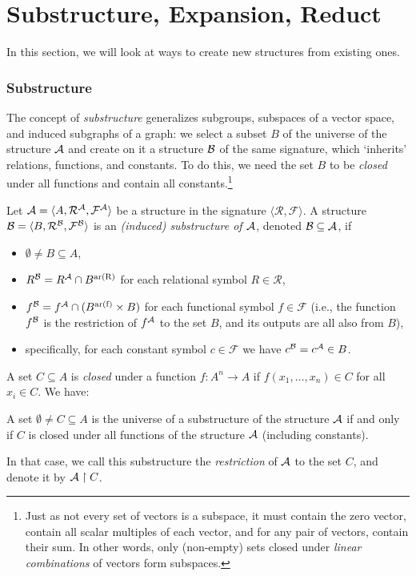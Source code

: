 \section{Substructure, Expansion, Reduct}

In this section, we will look at ways to create new structures from existing ones.

\subsubsection{Substructure}

The concept of \emph{substructure} generalizes subgroups, subspaces of a vector space, and induced subgraphs of a graph: we select a subset $B$ of the universe of the structure $\mathcal{A}$ and create on it a structure $\mathcal{B}$ of the same signature, which `inherits' relations, functions, and constants. To do this, we need the set $B$ to be \emph{closed} under all functions and contain all constants.\footnote{Just as not every set of vectors is a subspace, it must contain the zero vector, contain all scalar multiples of each vector, and for any pair of vectors, contain their sum. In other words, only (non-empty) sets closed under \emph{linear combinations} of vectors form subspaces.}

\begin{definition}[Substructure]
Let $\mathcal{A}=\langle A,\mathcal R^\mathcal A,\mathcal F^\mathcal A\rangle$ be a structure in the signature $\langle\mathcal R,\mathcal F\rangle$. A structure $\mathcal{B}=\langle B,\mathcal R^\mathcal B,\mathcal F^\mathcal B\rangle$ is an \emph{(induced) substructure of $\mathcal{A}$}, denoted $\mathcal{B}\subseteq\mathcal{A}$, if
\begin{itemize}
    \item $\emptyset\neq B\subseteq A$,
    \item $R^{\mathcal{B}}=R^{\mathcal{A}}\cap B^{\mathrm{ar(R)}}$ for each relational symbol $R\in \mathcal R$,
    \item $f^{\mathcal{B}}=f^{\mathcal{A}}\cap (B^{\mathrm{ar(f)}}\times B)$ for each functional symbol $f\in \mathcal F$ (i.e., the function $f^{\mathcal{B}}$ is the restriction of $f^{\mathcal{A}}$ to the set $B$, and its outputs are all also from $B$),
    \item specifically, for each constant symbol $c\in\mathcal F$ we have $c^{\mathcal{B}}=c^{\mathcal{A}}\in B$.
\end{itemize}
\end{definition}
A set $C\subseteq A$ is \emph{closed} under a function $f:A^n\to A$ if $f(x_1,\dots,x_n)\in C$ for all $x_i\in C$. We have:
\begin{observation}
    A set $\emptyset\neq C\subseteq A$ is the universe of a substructure of the structure $\mathcal{A}$ if and only if $C$ is closed under all functions of the structure $\mathcal{A}$ (including constants).
\end{observation}
In that case, we call this substructure the \emph{restriction} of $\mathcal{A}$ to the set $C$, and denote it by $\mathcal{A}\restriction C$.

